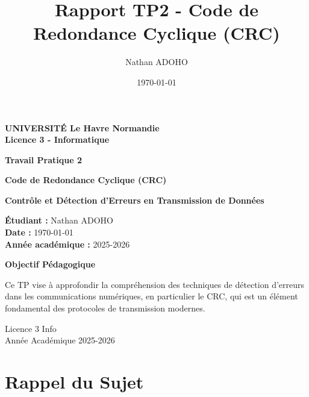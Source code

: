 \documentclass[12pt, a4paper]{article}
\title{Rapport TP2 - Code de Redondance Cyclique (CRC)}
\author{Nathan ADOHO}
\date{\today}
\begin{document}
\begin{titlepage}
\centering
\vspace*{2cm}

\Large
\textbf{UNIVERSITÉ Le Havre Normandie}\\
\textbf{Licence 3 - Informatique}

\vspace{3cm}

\huge
\textbf{Travail Pratique 2}

\vspace{0.5cm}

\LARGE
\textbf{Code de Redondance Cyclique (CRC)}

\vspace{3cm}

\Large
\textbf{Contrôle et Détection d'Erreurs en Transmission de Données}

\vspace{4cm}

\large
\textbf{Étudiant :} Nathan ADOHO\\
\vspace{0.3cm}
\textbf{Date :} \today\\
\vspace{0.3cm}
\textbf{Année académique :} 2025-2026

\vspace{4cm}

\begin{center}
\parbox{0.8\textwidth}{
\centering
\textbf{Objectif Pédagogique}\par
\vspace{0.5cm}
Ce TP vise à approfondir la compréhension des techniques de détection d'erreurs dans les communications numériques, en particulier le CRC, qui est un élément fondamental des protocoles de transmission modernes.
}
\end{center}

\vfill

\footnotesize
Licence 3 Info\\
Année Académique 2025-2026
\end{titlepage}

\maketitle

\tableofcontents
\newpage

\section{Rappel du Sujet}
\end{document}
